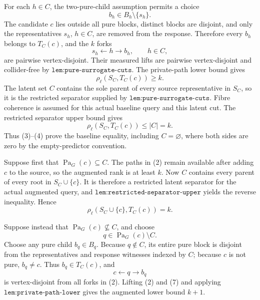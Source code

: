 For each \(h\in C\), the two-pure-child assumption permits a choice
\[
 b_h\in B_h\setminus\{s_h\}. \tag{1}
\]
The candidate \(c\) lies outside all pure blocks, distinct blocks are disjoint, and only the representatives \(s_h\), \(h\in C\), are removed from the response.  Therefore every \(b_h\) belongs to \(T_C(c)\), and the \(k\) forks
\[
 s_h\leftarrow h\to b_h,
 \qquad h\in C, \tag{2}
\]
are pairwise vertex-disjoint.  Their measured lifts are pairwise vertex-disjoint and collider-free by \(\texttt{lem:pure-surrogate-cuts}\).  The private-path lower bound gives
\[
 \rho_\ell(S_C,T_C(c))\geq k. \tag{3}
\]
The latent set \(C\) contains the sole parent of every source representative in \(S_C\), so it is the restricted separator supplied by \(\texttt{lem:pure-surrogate-cuts}\).  Fibre coherence is assumed for this actual baseline query and this latent cut.  The restricted separator upper bound gives
\[
 \rho_\ell(S_C,T_C(c))\leq |C|=k. \tag{4}
\]
Thus (3)--(4) prove the baseline equality, including \(C=\varnothing\), where both sides are zero by the empty-predictor convention.

Suppose first that \(\operatorname{Pa}_G(c)\subseteq C\).  The paths in (2) remain available after adding \(c\) to the source, so the augmented rank is at least \(k\).  Now \(C\) contains every parent of every root in \(S_C\cup\{c\}\).  It is therefore a restricted latent separator for the actual augmented query, and \(\texttt{lem:restricted-separator-upper}\) yields the reverse inequality.  Hence
\[
 \rho_\ell(S_C\cup\{c\},T_C(c))=k. \tag{5}
\]

Suppose instead that \(\operatorname{Pa}_G(c)\nsubseteq C\), and choose
\[
 q\in\operatorname{Pa}_G(c)\setminus C. \tag{6}
\]
Choose any pure child \(b_q\in B_q\).  Because \(q\notin C\), its entire pure block is disjoint from the representatives and response witnesses indexed by \(C\); because \(c\) is not pure, \(b_q\neq c\).  Thus \(b_q\in T_C(c)\), and
\[
 c\leftarrow q\to b_q \tag{7}
\]
is vertex-disjoint from all forks in (2).  Lifting (2) and (7) and applying \(\texttt{lem:private-path-lower}\) gives the augmented lower bound \(k+1\).

